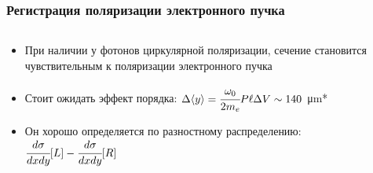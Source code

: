 \documentclass[12pt,aspectratio=169]{beamer}
\begin{document}
\begin{frame}[t]
	\frametitle{Регистрация поляризации электронного пучка}
	\begin{columns}[T]
	\begin{column}{0.49\linewidth}
		\begin{minipage}{1.\linewidth}
			\centering
			
			\begin{itemize}
				\item При наличии у фотонов циркулярной поляризации, сечение становится чувствительным к поляризации электронного пучка
				\item Стоит ожидать эффект порядка: $\Delta \langle y \rangle = \cfrac{\omega_0}{2m_e}P\ell\Delta V \sim 140$ \si{\micro\meter}*
				\item Он хорошо определяется по разностному распределению: $\cfrac{d\sigma}{dxdy}[L] - \cfrac{d\sigma}{dxdy}[R]$
			\end{itemize}
		\end{minipage}
	\end{column}
	\begin{column}{0.49\linewidth}
		\vspace{-1em}
		\begin{minipage}{1.\linewidth}
			\centering

\end{minipage}
\end{column}
\end{columns}
\end{frame}
\end{document}
